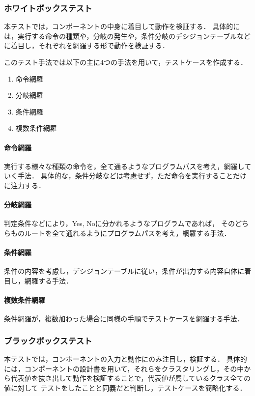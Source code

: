 \documentclass[platex,dvipdfmx,12pt]{jsarticle}
\begin{document}
\subsubsection{ホワイトボックステスト}
本テストでは，コンポーネントの中身に着目して動作を検証する．
具体的には，実行する命令の種類や，分岐の発生や，条件分岐のデシジョンテーブルなどに着目し，それぞれを網羅する形で動作を検証する．

このテスト手法では以下の主に4つの手法を用いて，テストケースを作成する．

\begin{enumerate}
  \item 命令網羅
  \item 分岐網羅
  \item 条件網羅
  \item 複数条件網羅
\end{enumerate}

\paragraph{命令網羅}
実行する様々な種類の命令を，全て通るようなプログラムパスを考え，網羅していく手法．
具体的な，条件分岐などは考慮せず，ただ命令を実行することだけに注力する．

\paragraph{分岐網羅}
判定条件などにより，Yes, Noに分かれるようなプログラムであれば，
そのどちらものルートを全て通れるようにプログラムパスを考え，網羅する手法．

\paragraph{条件網羅}
条件の内容を考慮し，デシジョンテーブルに従い，条件が出力する内容自体に着目し，網羅する手法．

\paragraph{複数条件網羅}
条件網羅が，複数加わった場合に同様の手順でテストケースを網羅する手法．



\subsubsection{ブラックボックステスト}
本テストでは，コンポーネントの入力と動作にのみ注目し，検証する．
具体的には，コンポーネントの設計書を用いて，それらをクラスタリングし，その中から代表値を抜き出して動作を検証することで，代表値が属しているクラス全ての値に対して
テストをしたことと同義だと判断し，テストケースを簡略化する．
\end{document}
